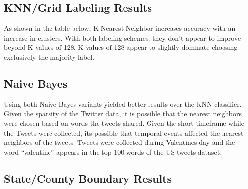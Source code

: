 \documentclass[midd]{thesis}
\begin{document}
\subsection{KNN/Grid Labeling Results}
As shown in the table below, K-Nearest Neighbor increases accuracy with an increase in clusters. With both labeling schemes, they don't appear to improve beyond K values of 128. K values of 128 appear to slightly dominate choosing exclusively the majority label.

\subsection{Naive Bayes}

Using both Naive Bayes variants yielded better results over the KNN classifier. Given the sparsity of the Twitter data, it is possible that the nearest neighbors were chosen based on words the tweets shared. Given the short timeframe while the Tweets were collected, its possible that temporal events affected the nearest neighbors of the tweets. Tweets were collected during Valentines day and the word ``valentine'' appears in the top 100 words of the US-tweets dataset.

\subsection{State/County Boundary Results}
\end{document}
